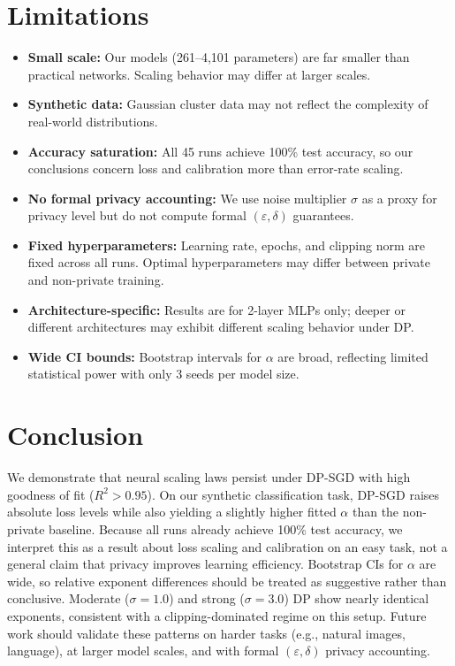 \documentclass[11pt,a4paper]{article}
\begin{document}
\section{Limitations}

\begin{itemize}
  \item \textbf{Small scale:} Our models (261--4,101 parameters) are far smaller than practical networks. Scaling behavior may differ at larger scales.
  \item \textbf{Synthetic data:} Gaussian cluster data may not reflect the complexity of real-world distributions.
  \item \textbf{Accuracy saturation:} All 45 runs achieve 100\% test accuracy, so our conclusions concern loss and calibration more than error-rate scaling.
  \item \textbf{No formal privacy accounting:} We use noise multiplier $\sigma$ as a proxy for privacy level but do not compute formal $(\varepsilon, \delta)$ guarantees.
  \item \textbf{Fixed hyperparameters:} Learning rate, epochs, and clipping norm are fixed across all runs. Optimal hyperparameters may differ between private and non-private training.
  \item \textbf{Architecture-specific:} Results are for 2-layer MLPs only; deeper or different architectures may exhibit different scaling behavior under DP.
  \item \textbf{Wide CI bounds:} Bootstrap intervals for $\alpha$ are broad, reflecting limited statistical power with only 3 seeds per model size.
\end{itemize}

\section{Conclusion}

We demonstrate that neural scaling laws persist under DP-SGD with high goodness of fit ($R^2 > 0.95$). On our synthetic classification task, DP-SGD raises absolute loss levels while also yielding a slightly higher fitted $\alpha$ than the non-private baseline. Because all runs already achieve 100\% test accuracy, we interpret this as a result about loss scaling and calibration on an easy task, not a general claim that privacy improves learning efficiency. Bootstrap CIs for $\alpha$ are wide, so relative exponent differences should be treated as suggestive rather than conclusive. Moderate ($\sigma = 1.0$) and strong ($\sigma = 3.0$) DP show nearly identical exponents, consistent with a clipping-dominated regime on this setup. Future work should validate these patterns on harder tasks (e.g., natural images, language), at larger model scales, and with formal $(\varepsilon, \delta)$ privacy accounting.
\end{document}
